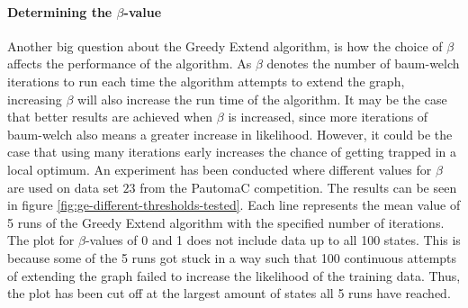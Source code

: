 \paragraph{Determining the $\beta$-value}
Another big question about the Greedy Extend algorithm, is how the choice of $\beta$ affects the performance of the algorithm.
As $\beta$ denotes the number of \gls{baum-welch} iterations to run each time the algorithm attempts to extend the graph, increasing $\beta$ will also increase the run time of the algorithm. It may be the case that better results are achieved when $\beta$ is increased, since more iterations of \gls{baum-welch} also means a greater increase in likelihood. However, it could be the case that using many iterations early increases the chance of getting trapped in a local optimum.
An experiment has been conducted where different values for $\beta$ are used on data set $23$ from the PautomaC competition. The results can be seen in figure \ref{fig:ge-different-thresholds-tested}. Each line represents the mean value of 5 runs of the Greedy Extend algorithm with the specified number of iterations. The plot for $\beta$-values of 0 and 1 does not include data up to all 100 states. This is because some of the 5 runs got stuck in a way such that 100 continuous attempts of extending the graph failed to increase the likelihood of the training data. Thus, the plot has been cut off at the largest amount of states all 5 runs have reached. 

